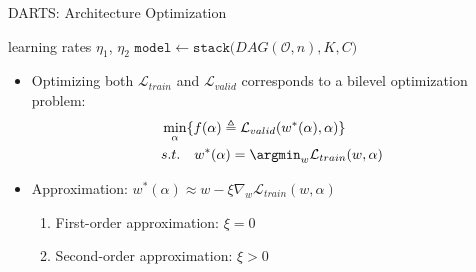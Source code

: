 
\begin{frame}[c]{DARTS: Architecture Optimization}

\begin{algorithm}[H]
    \footnotesize
    \caption{DARTS}
    \begin{algorithmic}
    \STATE \hspace{7mm} learning rates $\eta_1$, $\eta_2$
    \STATE $\texttt{model} \gets \texttt{stack}\big(DAG(\mathcal{O}, \textit{n}),K, C\big)$
    \ENDWHILE
    \OUTPUT{$\alpha$}
    \end{algorithmic}
\end{algorithm}

{\footnotesize
\begin{itemize}
    \item Optimizing both $\mathcal{L}_{train}$ and $\mathcal{L}_{valid}$ corresponds to a bilevel optimization problem:
    \begin{align}
        &\min_{\alpha} \{ f(\alpha) \triangleq \mathcal{L}_{valid}(w^*(\alpha), \alpha) \} \label{eqn:dartsbilevelA} \nonumber\\
        &s.t.\quad w^*(\alpha) = \argmin_{w} \mathcal{L}_{train}(w, \alpha)
        \nonumber
    \end{align}
    \item Approximation: $w^*(\alpha) \approx w - \xi \nabla_{w} \mathcal{L}_{train}(w, \alpha)$
    \begin{enumerate}
        \item \alert{First-order approximation:} $\xi = 0$
        \item \alert{Second-order approximation:} $\xi > 0$
    \end{enumerate}
\end{itemize}
}%

\end{frame}

